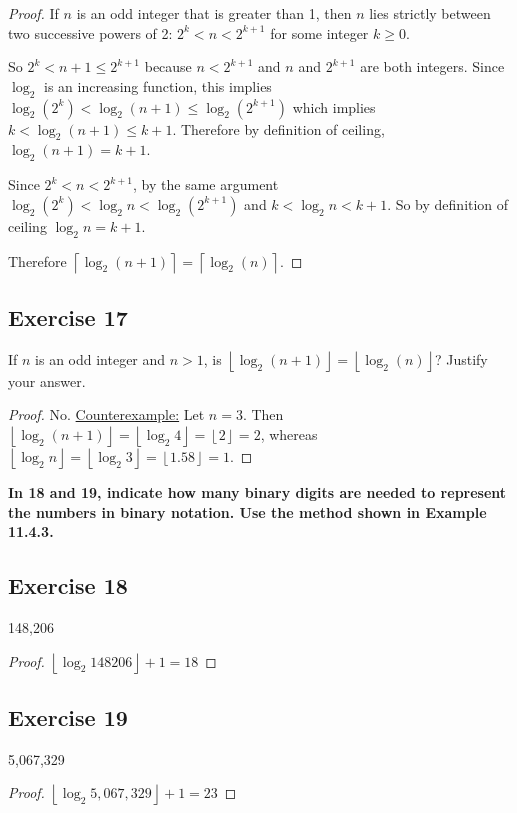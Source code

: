 \documentclass[14pt]{extarticle}
\newcommand{\cy}{\color{cyan}}
\newcommand{\floor}[1]{{\left\lfloor#1\right\rfloor}}
\newcommand{\ceil}[1]{{\left\lceil#1\right\rceil}}
\begin{document}
\begin{proof}
If \(n\) is an odd integer that is greater than 1, then \(n\) lies strictly between two successive powers of 2: \(2^k < n < 
2^{k+1}\) for some integer \(k \geq 0\). 

So \(2^k < n+1 \leq 2^{k+1}\) because \(n < 2^{k+1}\) and \(n\) and \(2^{k+1}\) are both integers. Since \(\log_2\) is an 
increasing function, this implies \(\log_2(2^k) < \log_2(n+1) \leq \log_2(2^{k+1})\) which implies \(k < \log_2(n+1) \leq k + 1\). Therefore by definition of ceiling, \(\log_2(n+1) = 
k+1\).

Since \(2^k < n < 2^{k+1}\), by the same argument \(\log_2(2^k) < \log_2 n < \log_2(2^{k+1})\) and \(k < \log_2 n 
< k+1\). So by definition of ceiling \(\log_2 n = k+1\).

Therefore \(\ceil{\log_2(n + 1)} = \ceil{\log_2(n)}\).
\end{proof}

\subsection{Exercise 17}
If \(n\) is an odd integer and \(n > 1\), is \(\floor{\log_2(n + 1)} = \floor{\log_2(n)}\)? Justify your answer.

\begin{proof}
No. \underline{Counterexample:} Let \(n = 3\). Then \(\floor{\log_2 (n + 1)} =  \floor{\log_2 4} = \floor{2} = 2\), 
whereas \(\floor{\log_2 n} = \floor{\log_2 3} = \floor{1.58} = 1\).
\end{proof}

{\bf \cy In 18 and 19, indicate how many binary digits are needed to represent the numbers in binary notation. Use the 
method shown in Example 11.4.3.}

\subsection{Exercise 18}
148,206

\begin{proof}
\(\floor{\log_2 148206} + 1 = 18\)
\end{proof}

\subsection{Exercise 19}
5,067,329

\begin{proof}
\(\floor{\log_2 5,067,329} + 1 = 23\)
\end{proof}
\end{document}
